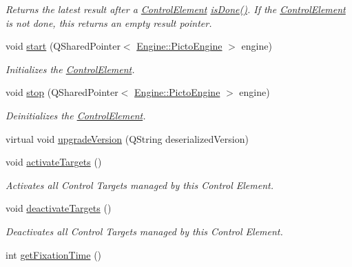 \begin{DoxyCompactItemize}
\begin{DoxyCompactList}\small\item\em Returns the latest result after a \hyperlink{class_picto_1_1_control_element}{Control\-Element} \hyperlink{class_picto_1_1_target_controller_af4af003d976912a0869f95a603c803e8}{is\-Done()}. If the \hyperlink{class_picto_1_1_control_element}{Control\-Element} is not done, this returns an empty result pointer. \end{DoxyCompactList}\item 
void \hyperlink{class_picto_1_1_target_controller_affb5ce453fb86f690d8e192cb94f2b34}{start} (Q\-Shared\-Pointer$<$ \hyperlink{class_picto_1_1_engine_1_1_picto_engine}{Engine\-::\-Picto\-Engine} $>$ engine)
\begin{DoxyCompactList}\small\item\em Initializes the \hyperlink{class_picto_1_1_control_element}{Control\-Element}. \end{DoxyCompactList}\item 
void \hyperlink{class_picto_1_1_target_controller_a551400318402ed8a73874ad5c89cb98a}{stop} (Q\-Shared\-Pointer$<$ \hyperlink{class_picto_1_1_engine_1_1_picto_engine}{Engine\-::\-Picto\-Engine} $>$ engine)
\begin{DoxyCompactList}\small\item\em Deinitializes the \hyperlink{class_picto_1_1_control_element}{Control\-Element}. \end{DoxyCompactList}\item 
virtual void \hyperlink{class_picto_1_1_target_controller_afa263db7e833a2317be5d8411d217c33}{upgrade\-Version} (Q\-String deserialized\-Version)
\item 
void \hyperlink{class_picto_1_1_target_controller_a9617f5b78ed7e1ab4ce9a3ca5e3660be}{activate\-Targets} ()
\begin{DoxyCompactList}\small\item\em Activates all Control Targets managed by this Control Element. \end{DoxyCompactList}\item 
void \hyperlink{class_picto_1_1_target_controller_a2425a38079fab780c7ccbf0a2efaf3d5}{deactivate\-Targets} ()
\begin{DoxyCompactList}\small\item\em Deactivates all Control Targets managed by this Control Element. \end{DoxyCompactList}\item 
int \hyperlink{class_picto_1_1_target_controller_ac3e368d75c65f17e0cbc65c96d18a94b}{get\-Fixation\-Time} ()

\end{DoxyCompactItemize}
